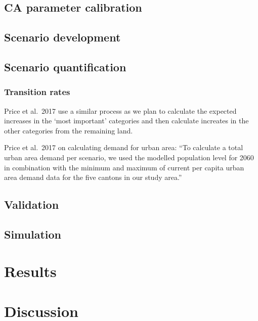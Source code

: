\documentclass[
  authoryear,
  preprint,
  onecolumn]{elsarticle}
\begin{document}
\hypertarget{ca-parameter-calibration}{%
\subsection{CA parameter calibration}\label{ca-parameter-calibration}}

\hypertarget{scenario-development}{%
\subsection{Scenario development}\label{scenario-development}}

\hypertarget{scenario-quantification}{%
\subsection{Scenario quantification}\label{scenario-quantification}}

\hypertarget{transition-rates}{%
\subsubsection{Transition rates}\label{transition-rates}}

Price et al.~2017 use a similar process as we plan to calculate the
expected increases in the `most important' categories and then calculate
increates in the other categories from the remaining land.

Price et al.~2017 on calculating demand for urban area: ``To calculate a
total urban area demand per scenario, we used the modelled population
level for 2060 in combination with the minimum and maximum of current
per capita urban area demand data for the five cantons in our study
area.''

\hypertarget{validation}{%
\subsection{Validation}\label{validation}}

\hypertarget{simulation}{%
\subsection{Simulation}\label{simulation}}

\hypertarget{results}{%
\section{Results}\label{results}}

\hypertarget{discussion}{%
\section{Discussion}\label{discussion}}
\end{document}
